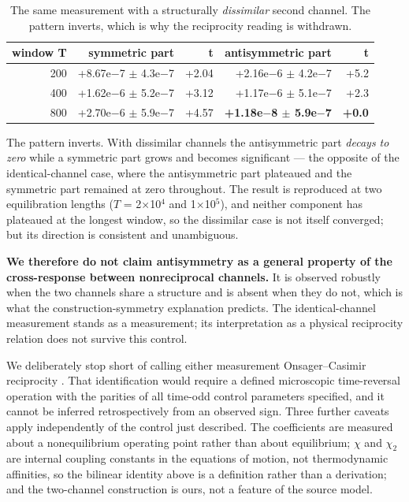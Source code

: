 \documentclass[aps,pre,preprint,superscriptaddress,nofootinbib,longbibliography]{revtex4-2}
\begin{document}
\begin{table}[htbp]
\caption{The same measurement with a structurally \emph{dissimilar} second channel. The pattern inverts, which is why the reciprocity reading is withdrawn.}
\label{tab:15}
\begin{ruledtabular}
\begin{tabular}{rrrrr}
window T & symmetric part & t & antisymmetric part & t \\
\hline
200 & +8.67e$-$7 $\pm$ 4.3e$-$7 & +2.04 & +2.16e$-$6 $\pm$ 4.2e$-$7 & +5.2 \\
400 & +1.62e$-$6 $\pm$ 5.2e$-$7 & +3.12 & +1.17e$-$6 $\pm$ 5.1e$-$7 & +2.3 \\
800 & +2.70e$-$6 $\pm$ 5.9e$-$7 & +4.57 & \textbf{+1.18e$-$8 $\pm$ 5.9e$-$7} & \textbf{+0.0} \\
\end{tabular}
\end{ruledtabular}
\end{table}

The pattern inverts. With dissimilar channels the antisymmetric part \emph{decays to zero} while a symmetric part grows and becomes significant --- the opposite of the identical-channel case, where the antisymmetric part plateaued and the symmetric part remained at zero throughout. The result is reproduced at two equilibration lengths ($T$ = 2$\times$10$^{4}$ and 1$\times$10$^{5}$), and neither component has plateaued at the longest window, so the dissimilar case is not itself converged; but its direction is consistent and unambiguous.

\textbf{We therefore do not claim antisymmetry as a general property of the cross-response between nonreciprocal channels.} It is observed robustly when the two channels share a structure and is absent when they do not, which is what the construction-symmetry explanation predicts. The identical-channel measurement stands as a measurement; its interpretation as a physical reciprocity relation does not survive this control.

We deliberately stop short of calling either measurement Onsager--Casimir reciprocity \cite{r7,r8}. That identification would require a defined microscopic time-reversal operation with the parities of all time-odd control parameters specified, and it cannot be inferred retrospectively from an observed sign. Three further caveats apply independently of the control just described. The coefficients are measured about a nonequilibrium operating point rather than about equilibrium; $\chi$ and $\chi _{2}$ are internal coupling constants in the equations of motion, not thermodynamic affinities, so the bilinear identity above is a definition rather than a derivation; and the two-channel construction is ours, not a feature of the source model.
\end{document}
